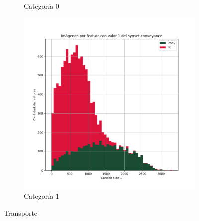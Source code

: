 \documentclass[12,twoside]{TFG-GM}
\theoremstyle{definition}
\theoremstyle{remark}
\begin{document}
\begin{figure}[ht]
\begin{subfigure}[b]{0.3\textwidth}
		\caption{Categoría 0}
	\end{subfigure}
	\begin{subfigure}[b]{0.3\textwidth}
		\includegraphics[width=\textwidth]  {Images/plots/25/synsets/Images_per_feature_of_1_category_conveyanceall_layers.png}
		\caption{Categoría 1}
	\end{subfigure}       
	\caption{Transporte}
\end{figure}
\end{document}

